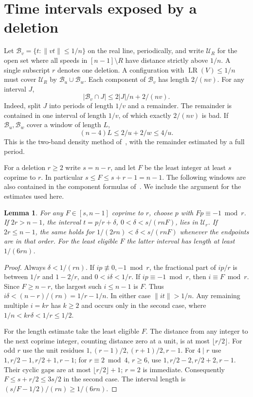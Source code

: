 \documentclass[11pt,a4paper]{article}
\newtheorem{lemma}[theorem]{Lemma}
\newcommand{\LR}{\operatorname{LR}}
\newcommand{\dist}[1]{\lVert #1\rVert}
\newcommand{\bad}{\mathcal B}
\newcommand{\good}{\mathcal U}
\begin{document}
\newpage
\section{Time intervals exposed by a deletion}
Let $\bad_v=\{t:\dist{vt}\le1/n\}$ on the real line, periodically, and
write $\good_R$ for the open set where all speeds in $[n-1]\setminus R$
have distance strictly above $1/n$. A single subscript $r$ denotes one
deletion. A configuration with $\LR(V)\le1/n$ must cover $\good_R$ by
$\bad_u\cup\bad_w$. Each component of $\bad_v$ has length $2/(nv)$.
For any interval $J$,
\begin{equation}\label{eq:density}
 |\bad_v\cap J|\le 2|J|/n+2/(nv).
\end{equation}
Indeed, split $J$ into periods of length $1/v$ and a remainder. The
remainder is contained in one interval of length $1/v$, of which exactly
$2/(nv)$ is bad. If $\bad_u,\bad_w$ cover a window of length $L$,
\begin{equation}\label{eq:u}
 (n-4)L\le 2/u+2/w\le4/u .
\end{equation}
This is the two-band density method of~\cite[Section 6]{Z}, with the
remainder estimated by a full period.

For a deletion $r\ge2$ write $s=n-r$, and let $F$ be the least integer
at least $s$ coprime to $r$. In particular $s\le F\le s+r-1=n-1$.
The following windows are also contained in the component formulas
of~\cite[Section 2]{Z}. We include the argument for the estimates used here.

\begin{lemma}\label{lem:window}
For any $F\in[s,n-1]$ coprime to $r$, choose $p$ with $Fp\equiv-1\bmod r$. If $2r>n-1$, the interval
$t=p/r+\delta$, $0<\delta<s/(rnF)$, lies in $\good_r$.
If $2r\le n-1$, the same holds for
$1/(2rn)<\delta<s/(rnF)$ whenever the endpoints are in that order.
For the least eligible $F$ the latter interval has length at least $1/(6rn)$.
\end{lemma}
\begin{proof}
Always $\delta<1/(rn)$. If $ip\not\equiv0,-1\bmod r$, the fractional
part of $ip/r$ is between $1/r$ and $1-2/r$, and $0<i\delta<1/r$.
If $ip\equiv-1\bmod r$, then $i\equiv F\bmod r$. Since $F\ge n-r$,
the largest such $i\le n-1$ is $F$. Thus
$i\delta<(n-r)/(rn)=1/r-1/n$. In either case $\dist{it}>1/n$.
Any remaining multiple $i=kr$ has $k\ge2$ and occurs only in the second
case, where $1/n<kr\delta<1/r\le1/2$.

For the length estimate take the least eligible $F$. The distance from any integer to the next coprime
integer, counting distance zero at a unit, is at most $\lfloor r/2\rfloor$.
For odd $r$ use the unit residues $1,(r-1)/2,(r+1)/2,r-1$.
For $4\mid r$ use $1,r/2-1,r/2+1,r-1$; for $r\equiv2\bmod4$, $r\ge6$,
use $1,r/2-2,r/2+2,r-1$. Their cyclic gaps are at most $\lfloor r/2\rfloor+1$;
$r=2$ is immediate. Consequently $F\le s+r/2\le3s/2$ in the second
case. The interval length is $(s/F-1/2)/(rn)\ge1/(6rn)$.
\end{proof}
\end{document}
